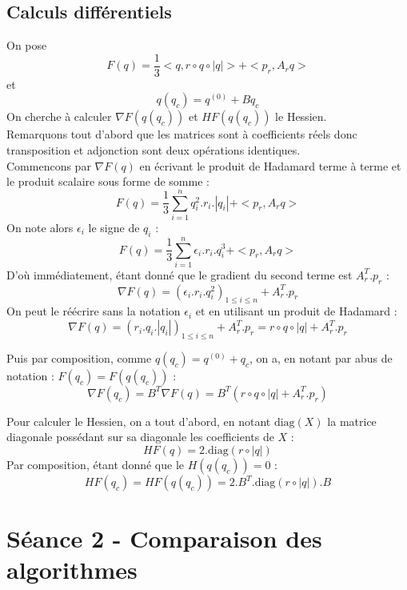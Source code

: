 \documentclass{article}
\begin{document}
    \subsection{Calculs différentiels}
        On pose \[ F(q) = \frac{1}{3}<q, r \circ q \circ |q|> + <p_r, A_rq> \] et \[q(q_c) = q^{(0)} + Bq_c \]
        On cherche à calculer $\nabla F(q(q_c))$ et $H F(q(q_c))$ le Hessien.\\
        Remarquons tout d'abord que les matrices sont à coefficients réels donc transposition et adjonction sont deux opérations identiques.\\
        Commencons par $\nabla F(q)$ en écrivant le produit de Hadamard terme à terme et le produit scalaire sous forme de somme :
        \[ F(q) = \frac{1}{3}\sum_{i = 1}^n q_i^2.r_i.|q_i| + <p_r, A_rq>\]
        On note alors $\epsilon_i$ le signe de $q_i$ :
        \[ F(q) = \frac{1}{3}\sum_{i = 1}^n \epsilon_i.r_i.q_i^3 + <p_r, A_rq>\]
        D'où immédiatement, étant donné que le gradient du second terme est $A_r^T.p_r$ :
        \[\nabla F(q) = (\epsilon_i.r_i.q_i^2)_{1 \leq i \leq n} + A_r^T.p_r\]
        On peut le réécrire sans la notation $\epsilon_i$ et en utilisant un produit de Hadamard : 
        \[ \boxed{\nabla F(q) = (r_i.q_i.|q_i|)_{1 \leq i \leq n} + A_r^T.p_r
            = r\circ q \circ |q| + A_r^T.p_r}\]

        Puis par composition, comme $q(q_c) = q^{(0)} + q_c$, on a, en notant par abus de notation : $F(q_c) = F(q(q_c))$ :
        \[ \boxed{\nabla F(q_c) = B^T\nabla F(q) = B^T(r\circ q \circ |q| + A_r^T.p_r)  
        }\]

        Pour calculer le Hessien, on a tout d'abord, en notant $\text{diag}(X)$ la matrice diagonale possédant sur sa diagonale les coefficients de $X$ :
        \[H F(q) = 2.\text{diag}(r\circ|q|)\]
        Par composition, étant donné que le $H(q(q_c)) = 0$ :
        \[ \boxed{H F(q_c) = H F(q(q_c)) = 2.B^T.\text{diag}(r\circ|q|).B}
        \] 

    \paragraph{}

\section{Séance 2 - Comparaison des algorithmes}
\end{document}
